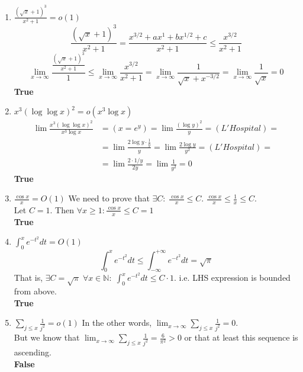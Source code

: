 \begin{enumerate}
    \item $\frac{(\sqrt x + 1)^3}{x^2 +1} = o(1)$
        \[\frac{(\sqrt x + 1)^3}{x^2 +1} = \frac{x^{3/2}+ax^{1}+bx^{1/2} +c}{x^2 + 1} \le \frac{x^{3/2}}{x^2+1}\]
        \[\lim_{x\to\infty}\frac{\frac{(\sqrt x + 1)^3}{x^2 +1}}{1} \le \lim_{x\to\infty}\frac{x^{3/2}}{x^2+1}
        = \lim_{x\to\infty}\frac{1}{\sqrt{x}+x^{-3/2}} = \lim_{x\to\infty}\frac{1}{\sqrt{x}} = 0
        \]
        \qedsymbol \quad \textbf{True}


    \item $x^3(\log \log x)^2 = o(x^3\log x)$
        \begin{align*}
            \lim\frac{x^3(\log \log x)^2}{x^3\log x} &= (x = e^y) = \lim\frac{(\log y)^2}{y} =
            (L'Hospital) = \\ &= \lim \frac{2 \log y \cdot \frac{1}{y}}{y} =
            \lim \frac{2 \log y}{y^2} = (L'Hospital) = \\
            &= \lim \frac{2 \cdot 1/y}{2y} = \lim \frac{1}{y^2} = 0
        \end{align*}
        \qedsymbol \quad \textbf{True}

    \item $\frac{\cos x}{x} = O(1)$
        We need to prove that $\displaystyle\exists C:\; \frac{\cos x}{x} \le C$.
        $\frac{\cos x}{x} \le \frac{1}{x} \le C$. \\
        Let $C=1$. Then $\forall x \ge 1: \frac{\cos x}{x} \le C = 1$\\
        \qedsymbol \quad \textbf{True}

    \item $\int_0^xe^{-t^2}dt=O(1)$
        \[\int_0^xe^{-t^2}dt \le \int_{-\infty}^{+\infty}e^{-t^2}dt = \sqrt{\pi} \]
        That is, 
        $\exists C=\sqrt{\pi}\;\forall x\in\mathbb{N}:\; \int_0^xe^{-t^2}dt \le C \cdot 1$.
        i.e. LHS expression is bounded from above.\\
        \qedsymbol \quad \textbf{True}

    \item $\sum_{j\le x}\frac{1}{j^2}=o(1)$
        In the other words, $\lim_{x\to \infty} \sum_{j\le x}\frac{1}{j^2} = 0$. \\
        But we know that $\lim_{x\to \infty} \sum_{j\le x}\frac{1}{j^2} = \frac{6}{\pi^2} > 0$ 
        or that at least this sequence is ascending.\\
        \qedsymbol \quad \textbf{False}
        
\end{enumerate}
